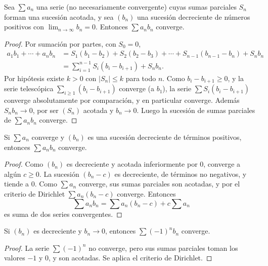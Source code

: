 \begin{theorem}
  Sea \(\sum a_n\) una serie (no necesariamente convergente) cuyas sumas parciales \(S_n\) forman una sucesión acotada, y sea \({(b_n)}\) una sucesión decreciente de números positivos con \(\lim_{n \to \infty} b_n = 0\). Entonces \(\sum a_n b_n\) converge.
\end{theorem}

\begin{proof}
  Por sumación por partes, con \(S_0 = 0\),
  \begin{align*}
    a_1 b_1 + \cdots + a_n b_n & = S_1 (b_1 - b_2) + S_2 (b_2 - b_3) + \cdots + S_{n-1} (b_{n-1} - b_n) + S_n b_n \\
                               & = \sum_{i=1}^{n-1} S_i (b_i - b_{i+1}) + S_n b_n.
  \end{align*}
  Por hipótesis existe \(k > 0\) con \(|S_n| \leq k\) para todo \(n\). Como \(b_i - b_{i+1} \geq 0\), y la serie telescópica \(\sum_{i \geq 1} (b_i - b_{i+1})\) converge (a \(b_1\)), la serie \(\sum S_i (b_i - b_{i+1})\) converge absolutamente por comparación, y en particular converge. Además \(S_n b_n \to 0\), por ser \((S_n)\) acotada y \(b_n \to 0\). Luego la sucesión de sumas parciales de \(\sum a_n b_n\) converge.
\end{proof}

\begin{corollary}
  Si \(\sum a_n\) converge y \({(b_n)}\) es una sucesión decreciente de términos positivos, entonces \(\sum a_n b_n\) converge.
\end{corollary}

\begin{proof}
  Como \({(b_n)}\) es decreciente y acotada inferiormente por \(0\), converge a algún \(c \geq 0\). La sucesión \({(b_n - c)}\) es decreciente, de términos no negativos, y tiende a \(0\). Como \(\sum a_n\) converge, sus sumas parciales son acotadas, y por el criterio de Dirichlet \(\sum a_n (b_n - c)\) converge. Entonces
  \[
    \sum a_n b_n = \sum a_n (b_n - c) + c \sum a_n
  \]
  es suma de dos series convergentes.
\end{proof}

\begin{corollary}
  Si \({(b_n)}\) es decreciente y \(b_n \to 0\), entonces \(\sum (-1)^n b_n\) converge.
\end{corollary}

\begin{proof}
  La serie \(\sum (-1)^n\) no converge, pero sus sumas parciales toman los valores \(-1\) y \(0\), y son acotadas. Se aplica el criterio de Dirichlet.
\end{proof}

